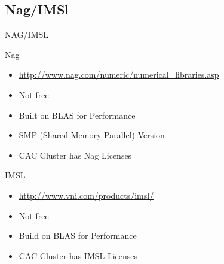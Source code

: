 \documentclass[handout]{beamer}
\begin{document}
\subsection{Nag/IMSl}
\begin{frame}{NAG/IMSL}
 \begin{block}{Nag}
  \begin{itemize}
   \item \url{http://www.nag.com/numeric/numerical\_libraries.asp}
   \item Not free
   \item Built on BLAS for Performance
   \item SMP (Shared Memory Parallel) Version
   \item CAC Cluster has Nag Licenses
  \end{itemize}
 \end{block}
 \begin{block}{IMSL}
  \begin{itemize}
   \item \url{http://www.vni.com/products/imsl/}
   \item Not free
   \item Build on BLAS for Performance
   \item CAC Cluster has IMSL Licenses
  \end{itemize}
 \end{block}
\end{frame}
\end{document}
